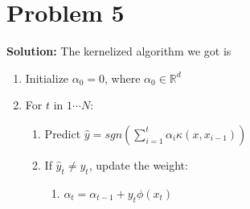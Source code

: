 \documentclass[11pt]{article}
\begin{document}
\section*{Problem 5}
\textbf{Solution:} 
 The kernelized algorithm we got is
 \begin{enumerate}
 	\item Initialize $\alpha_0=0$, where $\alpha_0\in \mathbb{R}^d$
 	\item For $t$ in $1 \cdots N$:
 	\begin{enumerate}
 		\item Predict $\hat{y} = sgn(\sum_{i = 1}^t \alpha_i \kappa(x, x_{i - 1}))$
 		\item If $\hat{y}_t \neq y_t$, update the weight:
 		\begin{enumerate}
 			\item $\alpha_{t} = \alpha_{t - 1} + y_t\phi(x_t)$
 		\end{enumerate}
 	\end{enumerate} 
 \end{enumerate}
\newpage \nocite{*}


\end{document}

